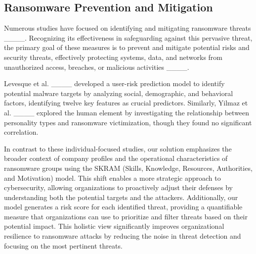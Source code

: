 \subsection{Ransomware Prevention and Mitigation}
Numerous studies have focused on identifying and mitigating ransomware threats ____. Recognizing its effectiveness in safeguarding against this pervasive threat, the primary goal of these measures is to prevent and mitigate potential risks and security threats, effectively protecting systems, data, and networks from unauthorized access, breaches, or malicious activities ____.

Levesque et al. ____ developed a user-risk prediction model to identify potential malware targets by analyzing social, demographic, and behavioral factors, identifying twelve key features as crucial predictors. Similarly, Yilmaz et al. ____ explored the human element by investigating the relationship between personality types and ransomware victimization, though they found no significant correlation.

In contrast to these individual-focused studies, our solution emphasizes the broader context of company profiles and the operational characteristics of ransomware groups using the SKRAM (Skills, Knowledge, Resources, Authorities, and Motivation) model. This shift enables a more strategic approach to cybersecurity, allowing organizations to proactively adjust their defenses by understanding both the potential targets and the attackers. Additionally, our model generates a risk score for each identified threat, providing a quantifiable measure that organizations can use to prioritize and filter threats based on their potential impact. This holistic view significantly improves organizational resilience to ransomware attacks by reducing the noise in threat detection and focusing on the most pertinent threats.